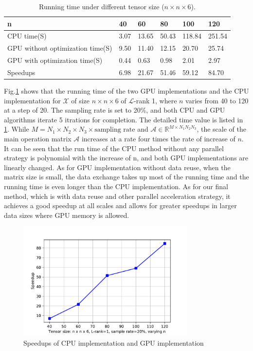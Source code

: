 \documentclass[journal,article,submit,moreauthors,pdftex,10pt,a4paper]{Definitions/mdpi}
\theoremstyle{plain}
\theoremstyle{definition}
\theoremstyle{remark}
\begin{document}
\begin{table}[t]
  \renewcommand{\arraystretch}{1.3}
  \centering
  \scriptsize
  \caption{Running time under different tensor size ($n \times n \times 6$).}
  \begin{tabular}{|l|l|l|l|l|l|}
    \hline
    \textbf{\textbf{n}} & \textbf{40}& \textbf{60}& \textbf{80} & \textbf{100} & \textbf{120}\\
    \hline
    CPU time(S) & 3.07 & 13.65 & 50.43 & 118.84 & 251.54\\
    \hline
    GPU without optimization time(S) & 9.50 & 11.40 & 12.15 & 20.70 & 25.74\\
    \hline
    GPU with optimization time(S) & 0.44 & 0.63 & 0.98 & 2.01 & 2.97\\
    \hline
    Speedups & 6.98 & 21.67 & 51.46 & 59.12 & 84.70\\
    \hline
  \end{tabular}
  \label{tbl_runtime}
\end{table}

Fig.\ref{pic:runtime} shows that the running time of the two GPU implementations and the CPU implementation for $\mathcal{X}$ of size $n\times n \times 6$ of $\mathcal{L}$-rank 1, where $n$ varies from 40 to 120 at a step of 20. The sampling rate is set to 20\%, and both CPU and GPU algorithms iterate 5 itrations for completion. The detailed time value is listed in \ref{tbl_runtime}. 
While $M = N_1 \times N_2 \times N_3 \times \text{sampling rate}$ and $\mathcal{A} \in \mathbb{R}^{M \times N_1N_2N_3}$, the scale of the main operation matrix $\mathcal{A}$ increases at a rate four times the rate of increase of $n$. 
It can be seen that the run time of the CPU method without any parallel strategy is polynomial with the increase of n, and both GPU implementations are linearly changed. As for GPU implementation without data reuse, when the matrix size is small, the data exchange takes up most of the running time and the running time is even longer than the CPU implementation. 
As for our final method, which is with data reuse and other parallel acceleration strategy, it achieves a good speedup at all scales and allows for greater speedups in larger data sizes where GPU memory is allowed.
\begin{figure}[t]
    \centering
    \includegraphics[width=3.5in]{speedup.pdf}
    \caption{Speedups of CPU implementation and GPU implementation}
    \label{pic:runtime}
\end{figure}
\end{document}
